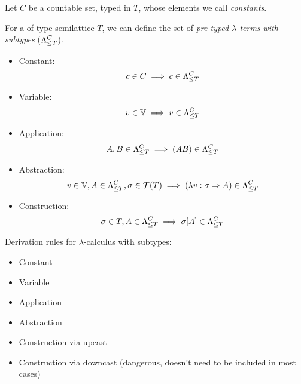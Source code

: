 \documentclass[main.tex]{subfiles}
\begin{document}
\begin{defn}
    Let $C$ be a countable set, typed in $T$,
    whose elements we call \emph{constants}.

    For a of type semilattice $T$, we can define the set of
    \emph{pre-typed $\lambda$-terms with subtypes} ($\fancylambda{T}{C}$).

    \begin{itemize}
        \item Constant:    \[ c \in C \implies c \in \fancylambda{T}{C} \]
        \item Variable:    \[ v \in \mathbb{V} \implies v \in \fancylambda{T}{C} \]
        \item Application: \[ A, B \in \fancylambda{T}{C} \implies (AB) \in \fancylambda{T}{C} \]
        \item Abstraction: \[ v \in \mathbb{V}, A \in \fancylambda{T}{C}, \sigma \in \tclos{T}
                \implies (\lambda v : \sigma \abstr A) \in \fancylambda{T}{C} \]
        \item Construction: \[ \sigma \in T, A \in \fancylambda{T}{C}
                \implies \sigma[A] \in \fancylambda{T}{C} \]
    \end{itemize}
\end{defn}

\begin{defn}
    Derivation rules for $\lambda$-calculus with subtypes:

    \begin{itemize}
        \item Constant
        \item Variable
        \item Application
        \item Abstraction
        \item Construction via upcast
        \item Construction via downcast (dangerous, doesn't need to be included in most cases)
    \end{itemize}
\end{defn}
\end{document}
